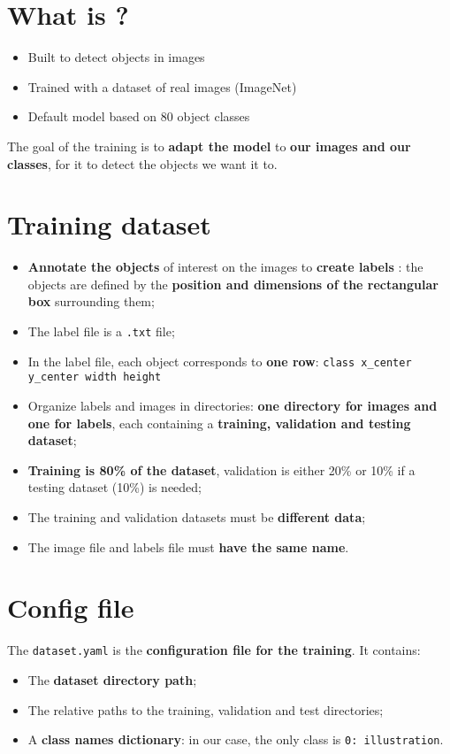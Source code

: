 \section{What is \yolov?}
	\begin{itemize}
		\item Built to detect objects in images
		\item Trained with a dataset of real images (ImageNet)
		\item Default model based on 80 object classes
	\end{itemize}

The goal of the training is to \textbf{adapt the model} to \textbf{our images and our classes}, for it to detect the objects we want it to.

\section{Training dataset}
	\begin{itemize}
		\item \textbf{Annotate the objects} of interest on the images to \textbf{create labels} : the objects are defined by the \textbf{position and dimensions of the rectangular box} surrounding them;
		\item The label file is a \texttt{.txt} file;
		\item In the label file, each object corresponds to \textbf{one row}: \texttt{class x\_center y\_center width height}
		\item Organize labels and images in directories: \textbf{one directory for images and one for labels}, each containing a \textbf{training, validation and testing dataset};
		\item \textbf{Training is 80\% of the dataset}, validation is either 20\% or 10\% if a testing dataset (10\%) is needed;
		\item The training and validation datasets must be \textbf{different data};
		\item The image file and labels file must \textbf{have the same name}.
	\end{itemize}

\section{Config file}
The \texttt{dataset.yaml} is the \textbf{configuration file for the training}. It contains:
	\begin{itemize}
		\item The \textbf{dataset directory path};
		\item The relative paths to the training, validation and test directories;
		\item A \textbf{class names dictionary}: in our case, the only class is \texttt{0: illustration}.
	\end{itemize}


